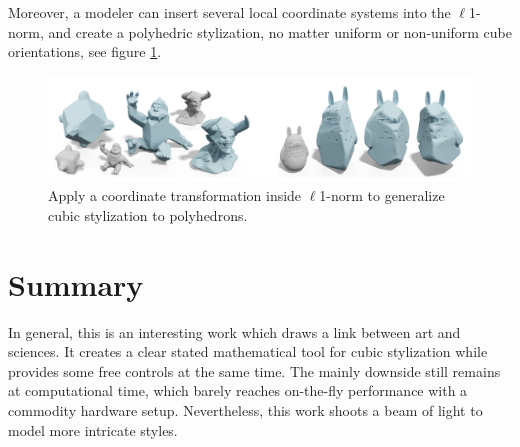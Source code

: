 \documentclass[a4paper,10pt]{article}
\begin{document}
Moreover, a modeler can insert several local coordinate systems into the $\ell$1-norm, and create a polyhedric stylization, no matter uniform or non-uniform cube orientations, see figure \ref{fig:poly}.
	\begin{figure}[hbt!]
		\includegraphics[width=\linewidth]{figures/coordinate}
		\caption{Apply a coordinate transformation inside $\ell$1-norm to generalize cubic stylization to polyhedrons.}
		\label{fig:poly}
	\end{figure}


\section{Summary }\label{sum}
In general, this is an interesting work which draws a link between art and sciences. It creates a clear stated mathematical tool for cubic stylization while provides some free controls at the same time. The mainly downside still remains at computational time, which barely reaches on-the-fly performance with a commodity hardware setup. Nevertheless, this work shoots a beam of light to model more intricate styles.

\newpage


\end{document}
